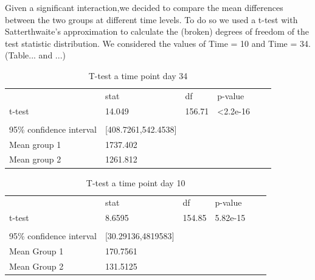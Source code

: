 \documentclass{article}
\begin{document}
Given a significant interaction,we decided to compare the mean differences between the two groups at different time levels. To do so we used a t-test with Satterthwaite's approximation to calculate the (broken) degrees of freedom of the test statistic distribution. We considered the values of Time = 10 and Time = 34.(Table... and ...) 



\begin{table}[h!]
\begin{tabular}{llllll}
\caption{T-test a time point day 34}
\cline{1-4}
                         & stat                    & df     & p-value            &  &  \\ \cline{1-4}
t-test                   & 14.049                  & 156.71 & \textless{}2.2e-16 &  &  \\
                         &                         &        &                    &  &  \\
95\% confidence interval & {[}408.7261,542.4538{]} &        &                    &  &  \\
Mean group 1             & 1737.402                &        &                    &  &  \\
Mean group 2             & 1261.812                &        &                    &  &  \\ \cline{1-4}
\end{tabular}
\end{table}



\begin{table}[h!]
\begin{tabular}{llllll}
\caption{T-test a time point day 10}
\cline{1-4}
                         & stat                    & df     & p-value   &  &  \\ \cline{1-4}
t-test                   & 8.6595                  & 154.85 & 5.82e-15 &  &  \\
                         &                         &        &           &  &  \\
95\% confidence interval & {[}30.29136,4819583{]} &        &           &  &  \\
Mean Group 1             & 170.7561                &        &           &  &  \\
Mean Group 2             & 131.5125                &        &           &  &  \\ \cline{1-4}
\end{tabular}
\end{table}
\end{document}
